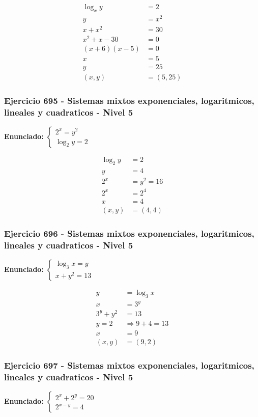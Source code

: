 \documentclass[12pt,a4paper]{article}
\begin{document}
\[
\begin{aligned}
\log_xy&=2\\
y&=x^2\\
x+x^2&=30\\
x^2+x-30&=0\\
(x+6)(x-5)&=0\\
x&=5\\
y&=25\\
(x,y)&=\boxed{(5,25)}
\end{aligned}
\]


\subsubsection*{Ejercicio 695 - Sistemas mixtos exponenciales, logaritmicos, lineales y cuadraticos - Nivel 5}
\textbf{Enunciado:} \(\begin{cases}2^x=y^2\\ \log_2y=2\end{cases}\)

\[
\begin{aligned}
\log_2y&=2\\
y&=4\\
2^x&=y^2=16\\
2^x&=2^4\\
x&=4\\
(x,y)&=\boxed{(4,4)}
\end{aligned}
\]


\subsubsection*{Ejercicio 696 - Sistemas mixtos exponenciales, logaritmicos, lineales y cuadraticos - Nivel 5}
\textbf{Enunciado:} \(\begin{cases}\log_3x=y\\ x+y^2=13\end{cases}\)

\[
\begin{aligned}
y&=\log_3x\\
x&=3^y\\
3^y+y^2&=13\\
y=2&\Rightarrow 9+4=13\\
x&=9\\
(x,y)&=\boxed{(9,2)}
\end{aligned}
\]


\subsubsection*{Ejercicio 697 - Sistemas mixtos exponenciales, logaritmicos, lineales y cuadraticos - Nivel 5}
\textbf{Enunciado:} \(\begin{cases}2^x+2^y=20\\ 2^{x-y}=4\end{cases}\)
\end{document}
